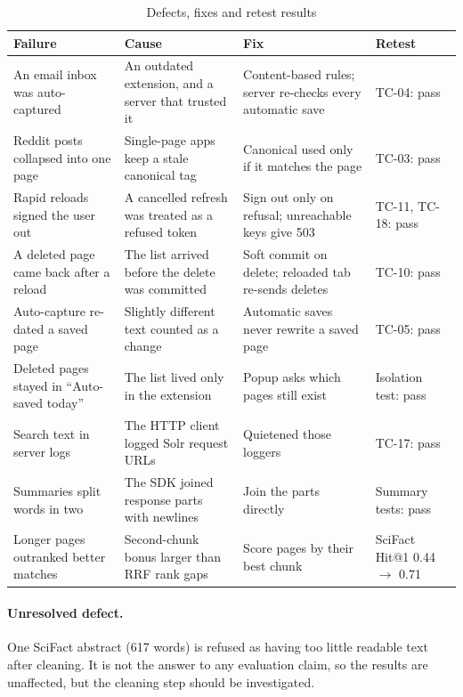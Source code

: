 \begin{table}[H]
\centering
\footnotesize
\begin{tabularx}{\textwidth}{>{\raggedright\arraybackslash}p{} L L >{\raggedright\arraybackslash}p{0.17\textwidth}}
\toprule
\textbf{Failure} & \textbf{Cause} & \textbf{Fix} & \textbf{Retest} \\
\midrule
An email inbox was auto-captured & An outdated extension, and a server that trusted it & Content-based rules; server re-checks every automatic save & TC-04: pass \\
Reddit posts collapsed into one page & Single-page apps keep a stale canonical tag & Canonical used only if it matches the page & TC-03: pass \\
Rapid reloads signed the user out & A cancelled refresh was treated as a refused token & Sign out only on refusal; unreachable keys give 503 & TC-11, TC-18: pass \\
A deleted page came back after a reload & The list arrived before the delete was committed & Soft commit on delete; reloaded tab re-sends deletes & TC-10: pass \\
Auto-capture re-dated a saved page & Slightly different text counted as a change & Automatic saves never rewrite a saved page & TC-05: pass \\
Deleted pages stayed in ``Auto-saved today'' & The list lived only in the extension & Popup asks which pages still exist & Isolation test: pass \\
Search text in server logs & The HTTP client logged Solr request URLs & Quietened those loggers & TC-17: pass \\
Summaries split words in two & The SDK joined response parts with newlines & Join the parts directly & Summary tests: pass \\
Longer pages outranked better matches & Second-chunk bonus larger than RRF rank gaps & Score pages by their best chunk & SciFact Hit@1 0.44 $\rightarrow$ 0.71 \\
\bottomrule
\end{tabularx}
\caption{Defects, fixes and retest results}
\label{tab:bugs}
\end{table}

\paragraph{Unresolved defect.} One SciFact abstract (617 words) is refused as
having too little readable text after cleaning. It is not the answer to any
evaluation claim, so the results are unaffected, but the cleaning step should
be investigated.

